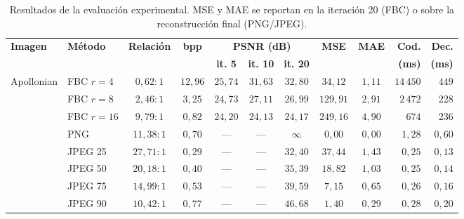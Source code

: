 \documentclass[a4paper]{llncs}
\begin{document}
\begin{table}[htbp]
    \centering
    \scriptsize
    \setlength{\tabcolsep}{2.2pt}
    \caption{Resultados de la evaluación experimental. MSE y MAE se reportan en la iteración 20 (FBC) o sobre la reconstrucción final (PNG/JPEG).}
    \label{tab:comparacion_metodos}

        \begin{tabular}{llcccccccrr}
        \toprule
        \textbf{Imagen} &
        \textbf{Método} &
        \textbf{Relación} &
        \textbf{bpp} &
        \multicolumn{3}{c}{\textbf{PSNR (dB)}} &
        \textbf{MSE} &
        \textbf{MAE} &
        \textbf{Cod.} &
        \textbf{Dec.} \\
        \cmidrule(lr){5-7}
        & & & & \textbf{it. 5} & \textbf{it. 10} & \textbf{it. 20} &
        & &
        \textbf{(ms)} & \textbf{(ms)} \\
        \midrule

        Apollonian & FBC $r{=}4$  & $0,62{:}1$  & $12,96$ & $25,74$ & $31,63$ & $32,80$ & $34,12$   & $1,11$  & $14\,450$ & $449$   \\
                   & FBC $r{=}8$  & $2,46{:}1$  & $3,25$  & $24,73$ & $27,11$ & $26,99$ & $129,91$  & $2,91$  & $2\,472$  & $228$   \\
                   & FBC $r{=}16$ & $9,79{:}1$  & $0,82$  & $24,20$ & $24,13$ & $24,17$ & $249,16$  & $4,90$  & $674$     & $236$   \\
                   & PNG          & $11,38{:}1$ & $0,70$  & ---     & ---     & $\infty$ & $0,00$   & $0,00$  & $1,28$    & $0,60$  \\
                   & JPEG 25      & $27,71{:}1$ & $0,29$  & ---     & ---     & $32,40$ & $37,44$   & $1,43$  & $0,25$    & $0,13$  \\
                   & JPEG 50      & $20,18{:}1$ & $0,40$  & ---     & ---     & $35,39$ & $18,82$   & $1,03$  & $0,25$    & $0,14$  \\
                   & JPEG 75      & $14,99{:}1$ & $0,53$  & ---     & ---     & $39,59$ & $7,15$    & $0,65$  & $0,26$    & $0,16$  \\
                   & JPEG 90      & $10,42{:}1$ & $0,77$  & ---     & ---     & $46,68$ & $1,40$    & $0,29$  & $0,28$    & $0,20$  \\
        \midrule


\end{tabular}
\end{table}
\end{document}
